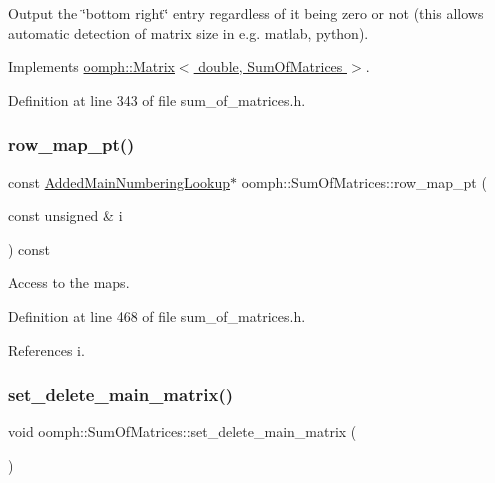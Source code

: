 Output the \char`\"{}bottom right\char`\"{} entry regardless of it being zero or not (this allows automatic detection of matrix size in e.\+g. matlab, python). 



Implements \hyperlink{classoomph_1_1Matrix_a10ee338f4d3893010291a692aea04248}{oomph\+::\+Matrix$<$ double, Sum\+Of\+Matrices $>$}.



Definition at line 343 of file sum\+\_\+of\+\_\+matrices.\+h.

\mbox{\label{classoomph_1_1SumOfMatrices_a502c316c8fc583a15ff52d025fb45e5e}} 
\subsubsection{\texorpdfstring{row\+\_\+map\+\_\+pt()}{row\_map\_pt()}}
{\footnotesize\ttfamily const \hyperlink{classoomph_1_1AddedMainNumberingLookup}{Added\+Main\+Numbering\+Lookup}$\ast$ oomph\+::\+Sum\+Of\+Matrices\+::row\+\_\+map\+\_\+pt (\begin{DoxyParamCaption}\item[{const unsigned \&}]{i }\end{DoxyParamCaption}) const\hspace{0.3cm}{\ttfamily [inline]}}



Access to the maps. 



Definition at line 468 of file sum\+\_\+of\+\_\+matrices.\+h.



References i.

\mbox{\label{classoomph_1_1SumOfMatrices_a873f5f3e937c1fa203506b2ccc81bd2e}} 
\subsubsection{\texorpdfstring{set\+\_\+delete\+\_\+main\+\_\+matrix()}{set\_delete\_main\_matrix()}}
{\footnotesize\ttfamily void oomph\+::\+Sum\+Of\+Matrices\+::set\+\_\+delete\+\_\+main\+\_\+matrix (\begin{DoxyParamCaption}{ }\end{DoxyParamCaption})\hspace{0.3cm}{\ttfamily [inline]}}



